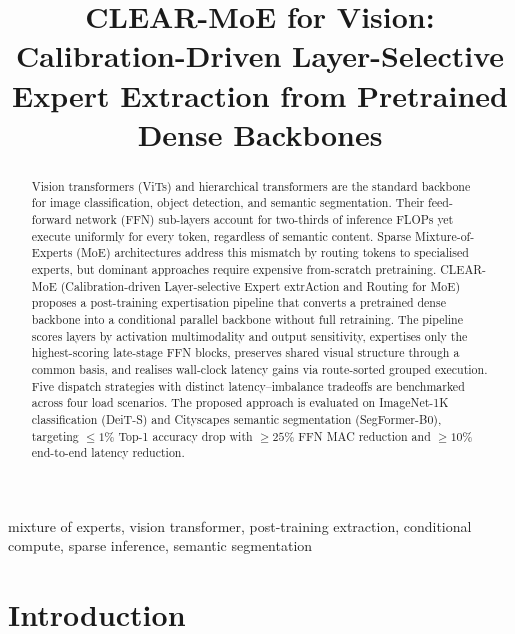 \documentclass[conference]{IEEEtran}
\begin{document}
\title{CLEAR-MoE for Vision: Calibration-Driven Layer-Selective Expert Extraction from Pretrained Dense Backbones}

\author{
}

\maketitle

\begin{abstract}
Vision transformers (ViTs) and hierarchical transformers are the standard backbone for image classification, object detection, and semantic segmentation. Their feed-forward network (FFN) sub-layers account for two-thirds of inference FLOPs yet execute uniformly for every token, regardless of semantic content. Sparse Mixture-of-Experts (MoE) architectures address this mismatch by routing tokens to specialised experts, but dominant approaches require expensive from-scratch pretraining. CLEAR-MoE (Calibration-driven Layer-selective Expert extrAction and Routing for MoE) proposes a post-training expertisation pipeline that converts a pretrained dense backbone into a conditional parallel backbone without full retraining. The pipeline scores layers by activation multimodality and output sensitivity, expertises only the highest-scoring late-stage FFN blocks, preserves shared visual structure through a common basis, and realises wall-clock latency gains via route-sorted grouped execution. Five dispatch strategies with distinct latency--imbalance tradeoffs are benchmarked across four load scenarios. The proposed approach is evaluated on ImageNet-1K classification (DeiT-S) and Cityscapes semantic segmentation (SegFormer-B0), targeting $\leq1\%$ Top-1 accuracy drop with $\geq25\%$ FFN MAC reduction and $\geq10\%$ end-to-end latency reduction.
\end{abstract}

\begin{IEEEkeywords}
mixture of experts, vision transformer, post-training extraction, conditional compute, sparse inference, semantic segmentation
\end{IEEEkeywords}

\section{Introduction}
\label{sec:intro}
\end{document}
